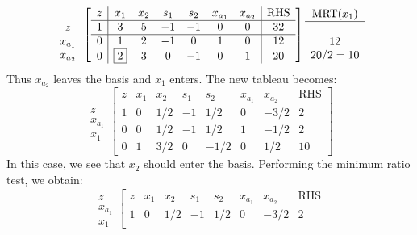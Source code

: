 \begin{example}
\begin{equation}
\begin{array}{c}
\\
z\\
x_{a_1}\\
x_{a_2}
\end{array}
\left[
\begin{array}{c|cccccc|c}
z & x_1 & x_2 & s_1 & s_2 & x_{a_1} & x_{a_2} & \text{RHS}\\
\hline
1 & 3 & 5 & -1 & -1 & 0 & 0 & 32\\
\hline
0 & 1 & 2 & -1 & 0  & 1 & 0 & 12\\
0 & \fbox{2} & 3 & 0  & -1 & 0 & 1 & 20
\end{array}
\right]
\begin{array}{c}
\text{MRT}(x_1)\\
\hline
\\
12\\
20/2 = 10
\end{array}
\end{equation}
Thus $x_{a_2}$ leaves the basis and $x_1$ enters. The new tableau becomes:
\begin{equation}
\begin{array}{c}
\\
z\\
x_{a_1}\\
x_{1}
\end{array}
\left[
\begin{array}{c|cccccc|c}
z & x_1 & x_2 & s_1 & s_2 & x_{a_1} & x_{a_2} & \text{RHS}\\
\hline
1 & 0 & 1/2 & -1 & 1/2 & 0 & -3/2 & 2\\
\hline
0 & 0 & 1/2 & -1 & 1/2  & 1 & -1/2 & 2\\
0 & 1 & 3/2 & 0  & -1/2 & 0 & 1/2 & 10
\end{array}
\right]
\end{equation}
In this case, we see that $x_2$ should enter the basis. Performing the minimum ratio test, we obtain:
\begin{equation}
\begin{array}{c}
\\
z\\
x_{a_1}\\
x_{1}
\end{array}
\left[
\begin{array}{c|cccccc|c}
z & x_1 & x_2 & s_1 & s_2 & x_{a_1} & x_{a_2} & \text{RHS}\\
\hline
1 & 0 & 1/2 & -1 & 1/2 & 0 & -3/2 & 2\\

\end{array}
\end{equation}
\end{example}
